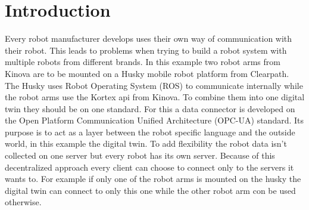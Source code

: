 \documentclass[conference]{IEEEtran}
\begin{document}
\section{Introduction}
Every robot manufacturer develops uses their own way of communication with their robot.
This leads to problems when trying to build a robot system with multiple robots from different brands.
In this example two robot arms from Kinova are to be mounted on a Husky mobile robot platform from Clearpath.
The Husky uses Robot Operating System (ROS) to communicate internally while the robot arms use the Kortex api from Kinova.
To combine them into one digital twin they should be on one standard.
For this a data connector is developed on the Open Platform Communication Unified Architecture (OPC-UA) standard.
Its purpose is to act as a layer between the robot specific language and the outside world, in this example the digital twin.
To add flexibility the robot data isn't collected on one server but every robot has its own server.
Because of this decentralized approach every client can choose to connect only to the servers it wants to.
For example if only one of the robot arms is mounted on the husky the digital twin can connect to only this one while the other robot arm con be used otherwise.
\end{document}
